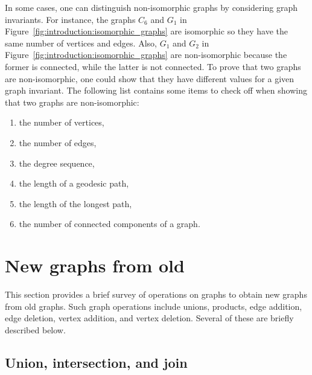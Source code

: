 In some cases, one can distinguish non-isomorphic graphs by
considering graph invariants. For instance, the
graphs $C_6$ and $G_1$ in
Figure~\ref{fig:introduction:isomorphic_graphs} are isomorphic so they
have the same number of vertices and edges. Also, $G_1$ and $G_2$ in
Figure~\ref{fig:introduction:isomorphic_graphs}  are non-isomorphic
because the former is connected, while the latter is not connected. To
prove that two graphs are non-isomorphic, one could show that they
have different values for a given graph invariant. The following list
contains some items to check off when showing that two graphs are
non-isomorphic:

\begin{enumerate}
\item the number of vertices,

\item the number of edges,

\item the degree sequence,

\item the length of a geodesic path,

\item the length of the longest path,

\item the number of connected components of a graph.
\end{enumerate}



\section{New graphs from old}
\label{sec:new_graphs_from_old}

This section provides a brief survey of operations on graphs to obtain
new graphs from old graphs. Such graph operations include unions,
products, edge addition, edge deletion, vertex addition, and vertex
deletion. Several of these are briefly described below.



\subsection{Union, intersection, and join}

